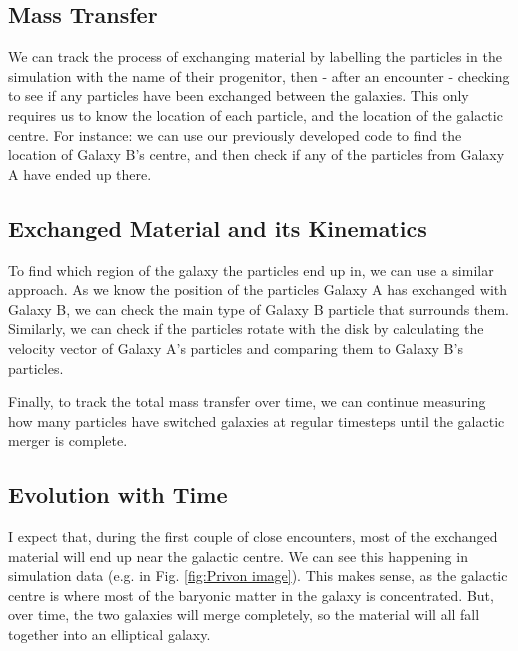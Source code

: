 \documentclass[linenumbers]{aastex631} %
\begin{document}
\subsection{Mass Transfer}

We can track the process of exchanging material by labelling the particles in the simulation with the name of their progenitor, then - after an encounter - checking to see if any particles have been exchanged between the galaxies. This only requires us to know the location of each particle, and the location of the galactic centre. For instance: we can use our previously developed code to find the location of Galaxy B's centre, and then check if any of the particles from Galaxy A have ended up there.

\subsection{Exchanged Material and its Kinematics}

To find which region of the galaxy the particles end up in, we can use a similar approach. As we know the position of the particles Galaxy A has exchanged with Galaxy B, we can check the main type of Galaxy B particle that surrounds them. Similarly, we can check if the particles rotate with the disk by calculating the velocity vector of Galaxy A's particles and comparing them to Galaxy B's particles. 

Finally, to track the total mass transfer over time, we can continue measuring how many particles have switched galaxies at regular timesteps until the galactic merger is complete.

\subsection{Evolution with Time}

I expect that, during the first couple of close encounters, most of the exchanged material will end up near the galactic centre. We can see this happening in simulation data (e.g. in Fig. \ref{fig:Privon image}). This makes sense, as the galactic centre is where most of the baryonic matter in the galaxy is concentrated. But, over time, the two galaxies will merge completely, so the material will all fall together into an elliptical galaxy.
\end{document}
